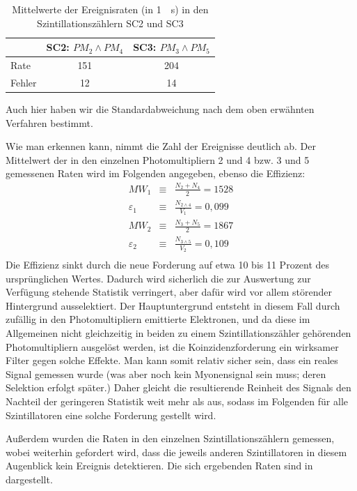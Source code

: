 \begin{table}[htbp]
\centering
\begin{tabular*}{\columnwidth}{l|cc}
\toprule
& {SC2: $PM_2\wedge PM_4$} & SC3: $PM_3\wedge PM_5$\\
\midrule
Rate & 151 & 204\\
Fehler & 12 & 14\\
\bottomrule
\end{tabular*}
\caption{Mittelwerte der Ereignisraten (in \SI{1}{\per\second}) in den
Szintillationszählern SC2 und SC3}
\label{tab:SC2_SC3_koinzidenz}
\end{table}
Auch hier haben wir die Standardabweichung nach dem oben erwähnten Verfahren
bestimmt.

Wie man erkennen kann, nimmt die Zahl der Ereignisse deutlich ab. Der
Mittelwert der in den einzelnen Photomultipliern 2 und 4 bzw. 3 und 5 gemessenen
Raten wird im Folgenden angegeben, ebenso die Effizienz:
\begin{eqnarray}
MW_1 &\equiv& \frac{N_2+N_4}{2} = 1528\\
ε_1 &\equiv& \frac{N_{2\wedge4}}{V_1} = 0,099\\
MW_2 &\equiv& \frac{N_3+N_5}{2} = 1867\\
ε_2 &\equiv& \frac{N_{3\wedge5}}{V_2} = 0,109\\		%
\end{eqnarray}
Die Effizienz sinkt durch die neue Forderung auf etwa 10 bis 11 Prozent des
ursprünglichen Wertes. Dadurch wird sicherlich die zur Auswertung zur Verfügung
stehende Statistik verringert, aber dafür wird vor allem störender Hintergrund
ausselektiert. Der Hauptuntergrund entsteht in diesem Fall durch zufällig in
den Photomultipliern emittierte Elektronen, und da diese im Allgemeinen nicht
gleichzeitig in beiden zu einem Szintillationszähler gehörenden
Photomultipliern ausgelöst werden, ist die Koinzidenzforderung ein wirksamer
Filter gegen solche Effekte. Man kann somit relativ sicher sein, dass ein reales
Signal gemessen wurde (was aber noch kein Myonensignal sein muss; deren
Selektion erfolgt später.) Daher gleicht die resultierende Reinheit des Signals
den Nachteil der geringeren Statistik weit mehr als aus, sodass im Folgenden
für alle Szintillatoren eine solche Forderung gestellt wird.

Außerdem wurden die Raten in den einzelnen Szintillationszählern gemessen,
wobei weiterhin gefordert wird, dass die jeweils anderen Szintillatoren in
diesem Augenblick kein Ereignis detektieren. Die sich ergebenden Raten sind in
 dargestellt.

